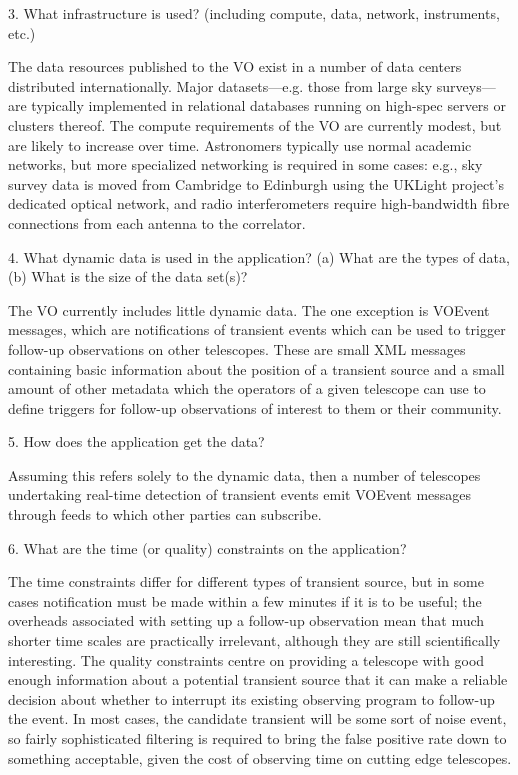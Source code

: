 \documentclass[preprint,12pt]{article}
\begin{document}
      3. What infrastructure is used? (including compute, data, network,
      instruments, etc.)

The data resources published to the VO exist in a number of data centers
distributed internationally. Major datasets---e.g. those from large sky
surveys---are typically implemented in relational databases running on high-spec servers
or clusters thereof. The compute requirements of the VO are currently modest,
but are likely to increase over time. Astronomers typically use normal academic
networks, but more specialized networking is required in some cases: e.g., sky
survey data is moved from Cambridge to Edinburgh using the UKLight project's
dedicated optical network, and radio interferometers require high-bandwidth
fibre connections from each antenna to the correlator.

      4. What dynamic data is used in the application?
(a) What are the types of data, (b) What is the size of the data set(s)?

The VO currently includes little dynamic data. The one exception is VOEvent
messages, which are notifications of transient events which can be used to
trigger follow-up observations on other telescopes. These are small XML messages
containing basic information about the position of a transient source and a
small amount of other metadata which the operators of a given telescope can use
to define triggers for follow-up observations of interest to them or their
community.

 5. How does the application get the data?

Assuming this refers solely to the dynamic data, then a number of telescopes
undertaking real-time detection of transient events emit VOEvent messages
through feeds to which other parties can subscribe.

6. What are the time (or quality) constraints on the application?

The time constraints differ for different types of transient source, but in some
cases notification must be made within a few minutes if it is to be useful; the
overheads associated with setting up a follow-up observation mean that much
shorter time scales are practically irrelevant, although they are still
scientifically interesting. The quality constraints centre on providing a
telescope with good enough information about a potential transient source that
it can make a reliable decision about whether to interrupt its existing
observing program to follow-up the event. In most cases, the candidate
transient will be some sort of noise event, so fairly sophisticated filtering is
required to bring the false positive rate down to something acceptable, given
the cost of observing time on cutting edge telescopes.
\end{document}
